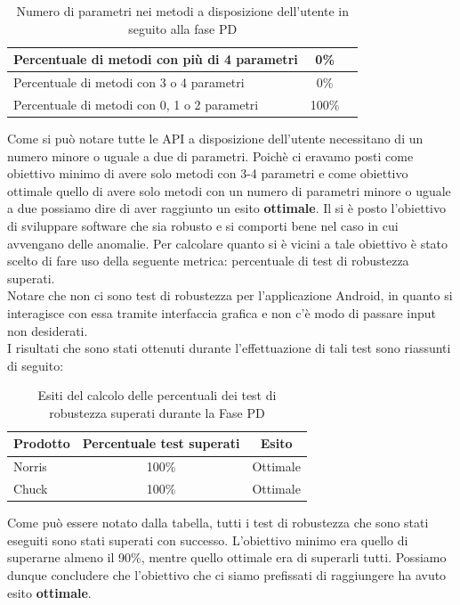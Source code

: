 				\begin{table}[H]
					\centering
					\begin{tabu}{| l | c | c |}
						\hline
						Percentuale di metodi con più di 4 parametri   & 0\% \\ \hline
						Percentuale di metodi con 3 o 4 parametri      & 0\% \\ \hline
						Percentuale di metodi con 0, 1 o 2 parametri   & 100\% \\ \hline
					\end{tabu}
					\caption{Numero di parametri nei metodi a disposizione dell'utente in seguito alla fase PD}
				\end{table}
				Come si può notare tutte le API a disposizione dell'utente necessitano di un numero minore o uguale a due di parametri. Poichè ci eravamo posti come obiettivo minimo di avere solo metodi con 3-4 parametri e come obiettivo ottimale quello di avere solo metodi con un numero di parametri minore o uguale a due possiamo dire di aver raggiunto un esito \textbf{ottimale}.
				Il \groupname si è posto l'obiettivo di sviluppare software che sia robusto e si comporti bene nel caso in cui avvengano delle anomalie. Per calcolare quanto si è vicini a tale obiettivo è stato scelto di fare uso della seguente metrica: percentuale di test di robustezza superati.\\
				Notare che non ci sono test di robustezza per l'applicazione Android, in quanto si interagisce con essa tramite interfaccia grafica e non c'è modo di passare input non desiderati.\\
				I risultati che sono stati ottenuti durante l'effettuazione di tali test sono riassunti di seguito:
				\begin{table}[H]
					\centering
					\begin{tabu}{| l | c | c |}
						\hline
						Prodotto      & Percentuale test superati   & Esito     \\ \hline \hline
						Norris	      & 100\%                       & Ottimale  \\ \hline
						Chuck	      & 100\%                       & Ottimale  \\ \hline
					\end{tabu}
					\caption{Esiti del calcolo delle percentuali dei test di robustezza superati durante la Fase PD}
				\end{table}
				Come può essere notato dalla tabella, tutti i test di robustezza che sono stati eseguiti sono stati superati con successo. L'obiettivo minimo era quello di superarne almeno il 90\%, mentre quello ottimale era di superarli tutti. Possiamo dunque concludere che l'obiettivo che ci siamo prefissati di raggiungere ha avuto esito \textbf{ottimale}.
